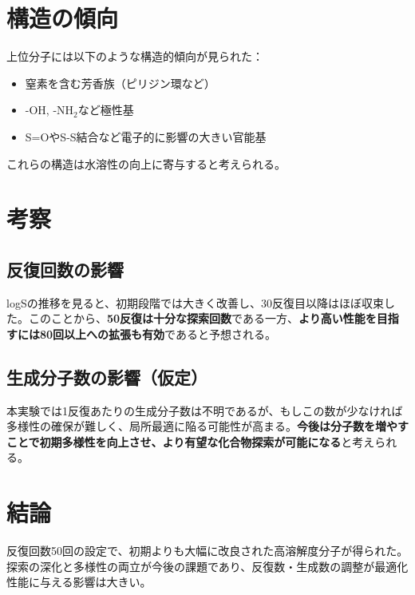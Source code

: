 \documentclass{article}
\begin{document}
\section{構造の傾向}
上位分子には以下のような構造的傾向が見られた：
\begin{itemize}
  \item 窒素を含む芳香族（ピリジン環など）
  \item -OH, -NH$_2$など極性基
  \item S=OやS-S結合など電子的に影響の大きい官能基
\end{itemize}
これらの構造は水溶性の向上に寄与すると考えられる。

\section{考察}
\subsection*{反復回数の影響}
logSの推移を見ると、初期段階では大きく改善し、30反復目以降はほぼ収束した。このことから、\textbf{50反復は十分な探索回数}である一方、\textbf{より高い性能を目指すには80回以上への拡張も有効}であると予想される。

\subsection*{生成分子数の影響（仮定）}
本実験では1反復あたりの生成分子数は不明であるが、もしこの数が少なければ多様性の確保が難しく、局所最適に陥る可能性が高まる。\textbf{今後は分子数を増やすことで初期多様性を向上させ、より有望な化合物探索が可能になる}と考えられる。

\section{結論}
反復回数50回の設定で、初期よりも大幅に改良された高溶解度分子が得られた。探索の深化と多様性の両立が今後の課題であり、反復数・生成数の調整が最適化性能に与える影響は大きい。
\end{document}
